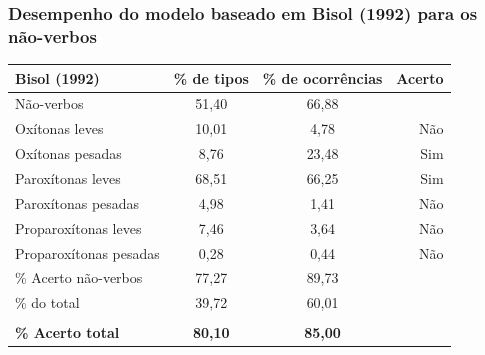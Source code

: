 \documentclass[xcolor=table]{beamer}
\begin{document}
	\begin{frame}
	\frametitle{Desempenho do modelo baseado em Bisol (1992) para os não-verbos}
\begin{table}[H]
	\centering
	\label{TAB227}
	\begin{tabular}{@{}lccr@{}}
		\toprule
		\textbf{Bisol (1992)}          & \textbf{\% de tipos}   & \textbf{\% de ocorrências} & \textbf{Acerto} \\ \midrule
			Não-verbos            & 51,40       & 66,88           &        \\
			Oxítonas leves                & 10,01       & 4,78            & Não      \\
			\rowcolor[HTML]{656565} 
			Oxítonas pesadas                & 8,76        & 23,48           & Sim      \\
			\rowcolor[HTML]{656565} 
			Paroxítonas leves               & 68,51       & 66,25           & Sim      \\
			Paroxítonas pesadas               & 4,98        & 1,41            & Não      \\
			Proparoxítonas leves                & 7,46        & 3,64            & Não      \\
			Proparoxítonas pesadas                & 0,28        & 0,44            & Não      \\
			\% Acerto não-verbos          & 77,27       & 89,73           &        \\
			\% do total           & 39,72       & 60,01           &        \\
			&               &                   &        \\
			{\bf \% Acerto total} & {\bf 80,10} & {\bf 85,00}     & {\bf } \\ \bottomrule
			\end{tabular}
		\end{table}

	\end{frame}
	
\end{document}
